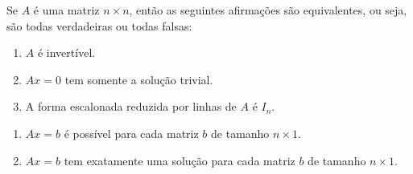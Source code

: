 \documentclass{beamer}
\begin{document}
    \begin{frame}
        \begin{teorema}
            Se $A$ é uma matriz $n \times n$, \pause então as seguintes afirmações são equivalentes, \pause ou seja, são todas verdadeiras \pause ou todas falsas:\pause
            \begin{enumerate}[label={\roman*})]
                \item $A$ é invertível.\pause

                \vspace{1cm}

                \item $Ax = 0$ \pause tem somente a solução trivial.\pause

                \vspace{1cm}

                \item A forma escalonada reduzida por linhas \pause de $A$ é $I_n$.

                \seti
            \end{enumerate}
        \end{teorema}
    \end{frame}

    \begin{frame}
        \begin{teorema}
            \begin{enumerate}[label={\roman*})]
                \conti



                \item $Ax = b$ é possível \pause para cada matriz $b$ de tamanho $n \times 1$.\pause

                \vspace{1cm}

                \item $Ax = b$ tem exatamente uma solução \pause para cada matriz $b$ de tamanho $n \times 1$.
            \end{enumerate}
        \end{teorema}
    \end{frame}
\end{document}
